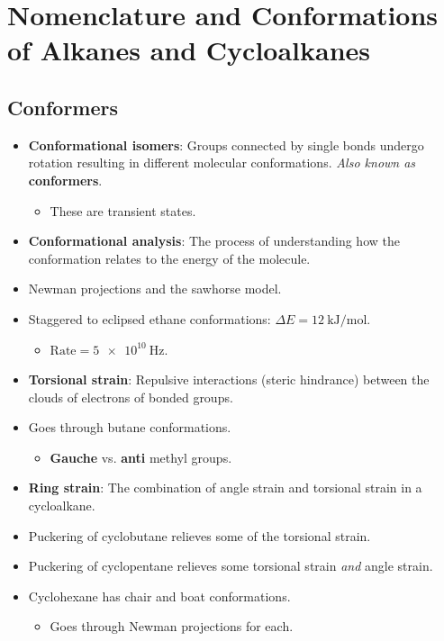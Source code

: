 \documentclass[../notes.tex]{subfiles}
\begin{document}
\chapter{Nomenclature and Conformations of Alkanes and Cycloalkanes}
\section{Conformers}
\begin{itemize}
    \item {}\textbf{Conformational isomers}: Groups connected by single bonds undergo rotation resulting in different molecular conformations. \emph{Also known as} \textbf{conformers}.
    \begin{itemize}
        \item These are transient states.
    \end{itemize}
    \item \textbf{Conformational analysis}: The process of understanding how the conformation relates to the energy of the molecule.
    \item Newman projections and the sawhorse model.
    \item Staggered to eclipsed ethane conformations: $\Delta E=\SI[per-mode=symbol]{12}{\kilo\joule\per\mole}$.
    \begin{itemize}
        \item $\text{Rate}=\SI{5e10}{\hertz}$.
    \end{itemize}
    \item \textbf{Torsional strain}: Repulsive interactions (steric hindrance) between the clouds of electrons of bonded groups.
    \item Goes through butane conformations.
    \begin{itemize}
        \item \textbf{Gauche} vs. \textbf{anti} methyl groups.
    \end{itemize}
    \item \textbf{Ring strain}: The combination of angle strain and torsional strain in a cycloalkane.
    \item Puckering of cyclobutane relieves some of the torsional strain.
    \item Puckering of cyclopentane relieves some torsional strain \emph{and} angle strain.
    \item Cyclohexane has chair and boat conformations.
    \begin{itemize}
        \item Goes through Newman projections for each.

\end{itemize}
\end{itemize}
\end{document}
